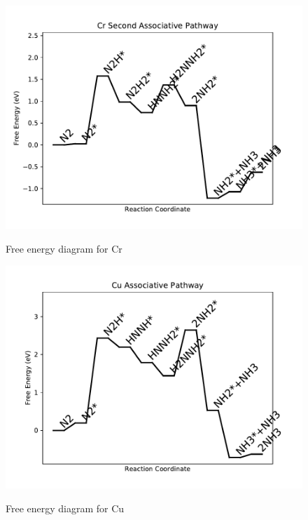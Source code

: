 \documentclass{article}
\begin{document}
\begin{figure}
\includegraphics[width=1\linewidth]{data/plots/Cr_associative_2.pdf}
\label{fig:Cr_associative_2}
\caption{Free energy diagram for Cr}
\end{figure}

\begin{figure}
\includegraphics[width=1\linewidth]{data/plots/Cu_associative.pdf}
\label{fig:Cu_associative}
\caption{Free energy diagram for Cu}
\end{figure}
\end{document}
